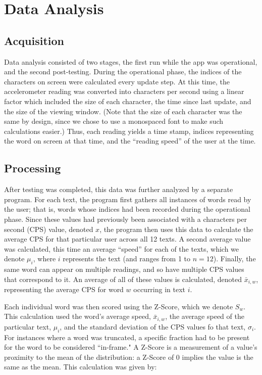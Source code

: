 \documentclass[11pt,letterpaper]{article}
\begin{document}
	\section{Data Analysis}
	
	\subsection{Acquisition}
	
	Data analysis consisted of two stages, the first run while the app was operational, and the second post-testing. During the operational phase, the indices of the characters on screen were calculated every update step. At this time, the accelerometer reading was converted into characters per second using a linear factor which included the size of each character, the time since last update, and the size of the viewing window. (Note that the size of each character was the same by design, since we chose to use a monospaced font to make such calculations easier.) Thus, each reading yields a time stamp, indices representing the word on screen at that time, and the ``reading speed'' of the user at the time.
	
	\subsection{Processing}
	
	After testing was completed, this data was further analyzed by a separate program. For each text, the program first gathers all instances of words read by the user; that is, words whose indices had been recorded during the operational phase. Since these values had previously been associated with a characters per second (CPS) value, denoted $x$, the program then uses this data to calculate the average CPS for that particular user across all 12 texts. A second average value was calculated, this time an average ``speed'' for each of the texts, which we denote $\mu_i$, where $i$ represents the text (and ranges from 1 to $n=12$). Finally, the same word can appear on multiple readings, and so have multiple CPS values that correspond to it. An average of all of these values is calculated, denoted $\bar{x}_{i,w}$, representing the average CPS for word $w$ occurring in text $i$.
	
	Each individual word was then scored using the Z-Score, which we denote $S_w$. This calculation used the word's average speed, $\bar{x}_{i,w}$, the average speed of the particular text, $\mu_i$, and the standard deviation of the CPS values fo that text, $\sigma_i$. For instances where a word was truncated, a specific fraction had to be present for the word to be considered ``in-frame." A Z-Score is a measurement of a value's proximity to the mean of the distribution: a Z-Score of 0 implies the value is the same as the mean. This calculation was given by:
	
\end{document}
